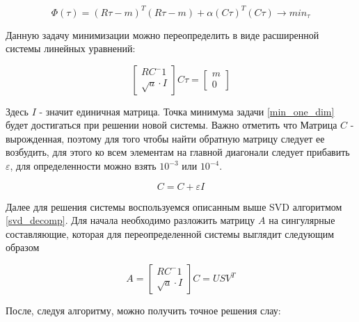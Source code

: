 \documentclass[a4paper,12pt]{diplom}
\renewcommand{\epsilon}{\varepsilon}
\begin{document}
\begin{equation}
 \Phi(\tau)=(R\tau-m)^T (R\tau-m) + \alpha(C\tau)^T(C\tau) \to min_{\tau}
 \label{min_one_dim}
\end{equation}

Данную задачу минимизации можно переопределить в виде расширенной системы линейных уравнений:

\begin{equation}
    \begin{bmatrix}
        RC^-1 \\
        \sqrt{a} \cdot I
    \end{bmatrix}
    C\tau = 
    \begin{bmatrix}
        m \\
        0
    \end{bmatrix}
    \label{system_one_dim}
\end{equation}

Здесь $I$ - значит единичная матрица. 
Точка минимума задачи \eqref{min_one_dim} будет достигаться при решении новой системы. Важно отметить что Матрица
$C$ - вырожденная, поэтому для того чтобы найти обратную матрицу следует ее возбудить, для этого ко всем элементам
на главной диагонали следует прибавить $\epsilon$, для определенности можно взять $10^{-3}$ или $10^{-4}$.

\begin{equation}
   C = C + \epsilon I
\end{equation}

Далее для решения системы воспользуемся описанным выше SVD алгоритмом \eqref{svd_decomp}. Для начала необходимо разложить 
матрицу $A$ на сингулярные составляющие, которая для переопределенной системы выглядит следующим образом

\begin{equation}
   A =
   \begin{bmatrix}
      RC^-1 \\
      \sqrt{a} \cdot I
  \end{bmatrix}
  C = USV^{T}
\end{equation}

После, следуя алгоритму, можно получить точное решения слау:
\end{document}

